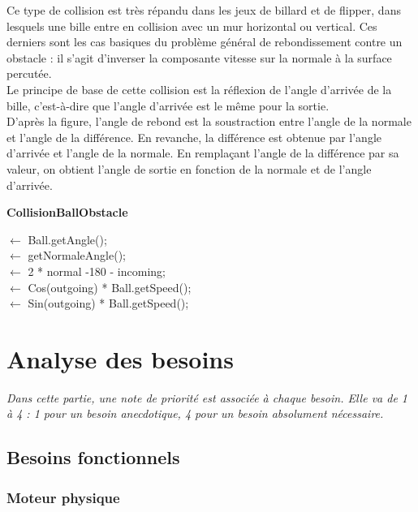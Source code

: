 \documentclass{report}
\begin{document}
Ce type de collision est très répandu dans les jeux de billard et de flipper, dans lesquels une bille entre en collision avec un mur horizontal ou vertical. Ces derniers sont les cas basiques du problème général de rebondissement contre un obstacle : il s’agit d’inverser la composante vitesse sur la normale à la surface percutée. \\

Le principe de base de cette collision est la réflexion de l’angle d’arrivée de la bille, c’est-à-dire que l’angle d’arrivée est le même pour la sortie. \\

D’après la figure, l’angle de rebond est la soustraction entre l’angle de la normale et l’angle de la différence. En revanche, la différence est obtenue par l’angle d’arrivée et l’angle de la normale. En remplaçant l’angle de la différence par sa valeur, on obtient l’angle de sortie en fonction de la normale et de l’angle d’arrivée.

\begin{algorithm}[h]
    \caption{{\bf CollisionBallObstacle} \label{CollisionBallObstacle}}
    \(\leftarrow\) Ball.getAngle();\\
    \(\leftarrow\) getNormaleAngle();\\
    \(\leftarrow\) 2 * normal -180 - incoming;\\
    \(\leftarrow\) Cos(outgoing) * Ball.getSpeed();\\
    \(\leftarrow\) Sin(outgoing) * Ball.getSpeed();\\
\end{algorithm}


\chapter{Analyse des besoins}

\textit{Dans cette partie, une note de priorité est associée à chaque besoin. Elle va de 1 à 4 : 1 pour un besoin anecdotique, 4 pour un besoin absolument nécessaire.}

\section{Besoins fonctionnels}

\subsection{Moteur physique}
\end{document}
